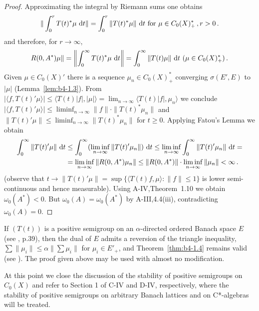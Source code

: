 \begin{proof}
Approximating the integral by Riemann sums one obtains 
\[
\|\int_0^r T(t)^*\mu \, \mathop{}\!\mathrm{d}{t}\| = \int_0^r \|T(t)^*\mu\| \, \mathop{}\!\mathrm{d}{t} \text{ for } \mu \in C_{0}(X)^*_{+}\,, r  >  0\,.
\]
and therefore, for $r \to \infty$, 
\[
 R(0,A^*)\mu\| = \left\|\int_0^{\infty} T(t)^*\mu \, \mathop{}\!\mathrm{d}{t}\right\| 
 = \int_0^{\infty} \|T(t)\mu\| \, \mathop{}\!\mathrm{d}{t}\  (\mu \in C_{0}(X)_{+}^{*})\,.
\]
Given $\mu \in C_{0}(X)'$ there is a sequence $\mu_n \in C_{0}(X)^*_+$ converging $\sigma(E',E)$ to $|\mu|$ (Lemma~\ref{lem:b4-1.3}).
From $|\langle f,T(t)'\mu \rangle| \leq \langle T(t)|f|,|\mu| \rangle = \lim_{n\to\infty} \langle T(t)|f|,\mu_n \rangle$ we conclude $|\langle f,T(t)'\mu \rangle| \leq \liminf_{n\to\infty}\|f\| \cdot \|T(t)^*\mu_n\|$ and 
\\
$\|T(t)'\mu\| \leq \liminf_{n\to\infty}\|T(t)^*\mu_n\|$ for $t \geq 0$. 
Applying Fatou's Lemma we obtain 
\[
\begin{aligned}
	\int_0^{\infty} \|T(t)'\mu\| \, \mathop{}\!\mathrm{d}{t} &\leq \int_0^{\infty} (\liminf_{n\to\infty} \|T(t)'\mu_n\|) \, \mathop{}\!\mathrm{d}{t} \leq  
	\liminf_{n\to\infty} \int_0^{\infty} \|T(t)'\mu_n\| \, \mathop{}\!\mathrm{d}{t} = \\ 
	& = \liminf_{n\to\infty} \|R(0,A^{*})\mu_n\| \leq \|R(0,A^{*})\|\cdot\liminf_{n\to\infty} \|\mu_n\| < \infty\,.
\end{aligned}
\]
(observe that $t \to \|T(t)'\mu\| = \sup \{\langle T(t)f,\mu \rangle \colon \|f\| \leq 1\}$ is lower semi-continuous and hence measurable). 
Using A-IV,Theorem~1.10 we obtain $\omega_{0}(A^{*})<0$. 
But $\omega_{0}(A) = \omega_{0}(A^{*})$ by A-III,4.4(iii), contradicting $\omega_{0}(A) = 0$.
\end{proof}

\begin{remark}\label{rem:b4-1.5}
If $(T(t))$ is a positive semigroup on an $\alpha$-directed ordered Banach space $E$ (see \citet{asimow:1980}, p.39), 
then the dual of $E$ admits a reversion of the triangle inequality, 
\ie $\sum\|\mu_i\| \leq \alpha\|\sum\mu_i\|$ 
for $\mu_i \in E'_+$, 
and Theorem~\ref{thm:b4-1.4} remains valid (see \citet{battydavies:1983}). 
The proof given above may be used with almost no modification.
\end{remark}

At this point we close the discussion of the stability of positive semigroups on $C_{0}(X)$ and refer to Section 1 of C-IV and D-IV, respectively, where the stability of positive semigroups on arbitrary Banach lattices and on C*-algebras will be treated.
%
\newpage
%

